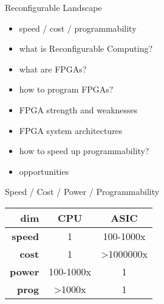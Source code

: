 % 
% 
% 
% 
% 
% 
% 
% 

\begin{frame}[fragile]{Reconfigurable Landscape}

\begin{itemize}
\item speed / cost / programmability
\item what is Reconfigurable Computing?
\item what are FPGAs?
\item how to program FPGAs?
\item FPGA strength and weaknesses
\item FPGA system architectures
\item how to speed up programmability?
\item opportunities
\end{itemize}

\end{frame}

\begin{frame}[fragile]{Speed / Cost / Power / Programmability}

\begin{center}
\begin{tabular}{|r|c|c|}
\hline
{\bf dim} & {\bf CPU} & {\bf ASIC} \\
\hline
{\bf speed} & 1 & 100-1000x \\
\hline
{\bf cost} & 1 & >1000000x \\
\hline
{\bf power} & 100-1000x & 1 \\
\hline
{\bf prog} & >1000x & 1 \\
\hline
\end{tabular}
\end{center}

\end{frame}

